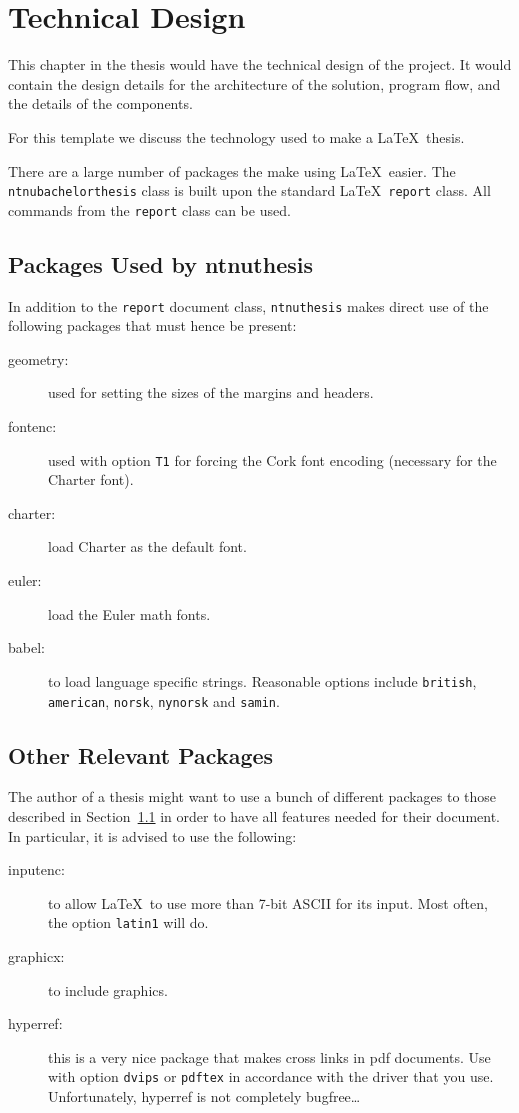 \chapter{Technical Design}
\label{chap:technical}

This chapter in the thesis would have the technical design of the project.  It would contain the design details for the architecture of the solution, program flow, and the details of the components.

For this template we discuss the technology used to make a \LaTeX\ thesis.

There are a large number of packages the make using \LaTeX\ easier.
The \texttt{ntnubachelorthesis} class is built upon the standard \LaTeX\
\texttt{report} class. All commands from the \texttt{report} class can
be used.

\section{Packages Used by ntnuthesis}
\label{sec:packages}
In addition to the \texttt{report} document class,
\texttt{ntnuthesis} makes direct use of the following packages
that must hence be present:
\begin{description}
	\item[geometry:] used for setting the sizes of the margins and
  	headers.
	\item[fontenc:] used with option \texttt{T1} for forcing the Cork font
  	encoding (necessary for the Charter font).
	\item[charter:] load Charter as the default font.
	\item[euler:] load the Euler math fonts.
	\item[babel:] to load language specific strings. Reasonable options
	  include \texttt{british}, \texttt{american}, \texttt{norsk},
	  \texttt{nynorsk} and \texttt{samin}.
\end{description}

\section{Other Relevant Packages}
\label{sec:otherpackages}

The author of a thesis might want to use a bunch of different packages
to those described in Section~\ref{sec:packages} in order to have all features needed for their document. 
In particular, it is advised to use the following:
\begin{description}
	\item[inputenc:] to allow \LaTeX\ to use more than 7-bit ASCII for its
	  input. Most often, the option \texttt{latin1} will do.
	\item[graphicx:] to include graphics.
	\item[hyperref:] this is a very nice package that makes cross links in
	  pdf documents. Use with option \texttt{dvips} or \texttt{pdftex}
	  in accordance with the driver that you use. Unfortunately, hyperref
	  is not completely bugfree\dots
\end{description}

